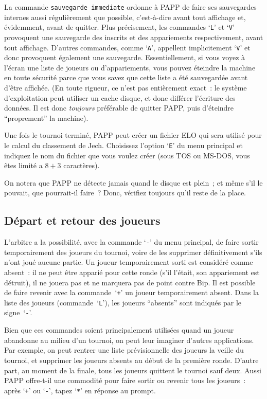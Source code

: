 \documentclass[10pt]{article}
\begin{document}
La commande \verb|sauvegarde immediate| ordonne à PAPP de faire ses 
sauve\-gardes internes aussi régulièrement que possible, 
c'est-à-dire avant tout affichage et, évidemment, avant de 
quitter.  Plus précisement, les commandes `\verb|L|' et `\verb|V|' 
provoquent une sauvegarde des inscrits et des appariements 
respectivement, avant tout affichage.  D'autres commandes, comme 
`\verb|A|', appellent implicitement `\verb|V|' et donc provoquent 
également une sauvegarde.  Essentiellement, si vous voyez à 
l'écran une liste de joueurs ou d'appariements, vous pouvez 
éteindre la machine en toute sécurité parce que vous savez que 
cette liste a été sauvegardée avant d'être affichée.  (En 
toute rigueur, ce n'est pas entièrement exact~: le système 
d'exploitation peut utiliser un cache disque, et donc différer 
l'écriture des données.  Il est donc {\em toujours\/} 
préférable de quitter PAPP, puis d'éteindre ``proprement'' la 
machine).

Une fois le tournoi terminé, PAPP peut créer un fichier ELO
qui sera utilisé pour le calcul du classement de Jech.  Choisissez
l'option `\verb|E|' du menu principal et indiquez le nom du fichier que vous
voulez créer (sous TOS ou MS-DOS, vous êtes limité a $8+3$
caractères).

On notera que PAPP ne détecte jamais quand le disque est
plein~; et même s'il le pouvait, que pourrait-il faire~?  Donc, vérifiez
toujours qu'il reste de la place.

\subsection{Départ et retour des joueurs}

L'arbitre a la possibilité, avec la commande `\verb|-|' du menu 
principal, de faire sortir temporairement des joueurs du tournoi, 
voire de les supprimer défini\-tivement s'ils n'ont joué aucune 
partie.  Un joueur temporairement sorti est considéré comme 
absent~: il ne peut être apparié pour cette ronde (s'il l'était, 
son appariement est détruit), il ne jouera pas et ne marquera pas de 
point contre Bip.  Il est possible de faire revenir avec la 
commande~`\verb|+|' un joueur temporairement absent.  Dans la liste 
des joueurs (commande~`\verb|L|'), les joueurs ``absents'' sont 
indiqués par le signe~`\verb|-|'.

Bien que ces commandes soient principalement utilisées quand un 
joueur abandonne au milieu d'un tournoi, on peut leur imaginer 
d'autres applications.  Par exemple, on peut rentrer une liste 
prévisionnelle des joueurs la veille du tournoi, et supprimer les 
joueurs absents au début de la première ronde.  D'autre part, au 
moment de la finale, tous les joueurs quittent le tournoi sauf deux.  
Aussi PAPP offre-t-il une commodité pour faire sortir ou revenir 
tous les joueurs~: après `\verb|+|' ou `\verb|-|', tapez `\verb|*|' 
en réponse au prompt.
\end{document}

